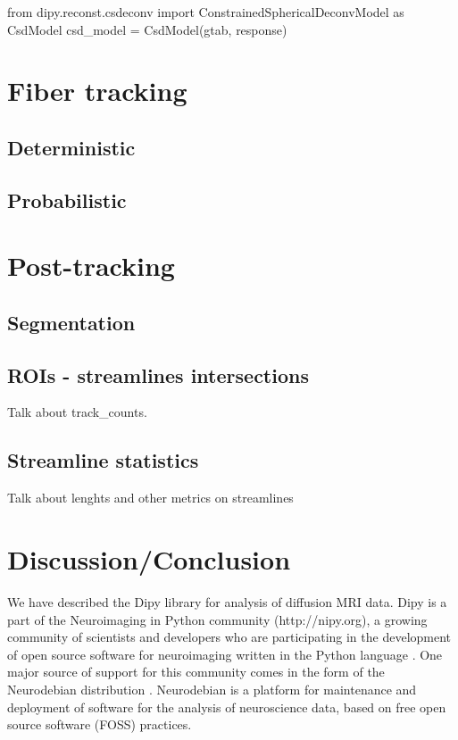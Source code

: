 \documentclass{bioinfo}
\begin{document}
\begin{python}
from dipy.reconst.csdeconv import
        ConstrainedSphericalDeconvModel as CsdModel
csd_model = CsdModel(gtab, response)
\end{python}

\section{Fiber tracking}

\subsection{Deterministic}

\subsection{Probabilistic}

\section{Post-tracking}

\subsection{Segmentation}

\subsection{ROIs - streamlines intersections}

Talk about track\_counts.

\subsection{Streamline statistics}

Talk about lenghts and other metrics on streamlines

\section{Discussion/Conclusion}

We have described the Dipy library for analysis of diffusion MRI data. Dipy is a part of the Neuroimaging in Python community (http://nipy.org), a growing community of scientists and developers who are participating in the development of open source software for neuroimaging written in the Python language  . One major source of support for this community comes in the form of the Neurodebian distribution \citep{Halchenko2012}. Neurodebian is a platform for maintenance and deployment of software for the analysis of neuroscience data, based on free open source software (FOSS) practices.
\end{document}
